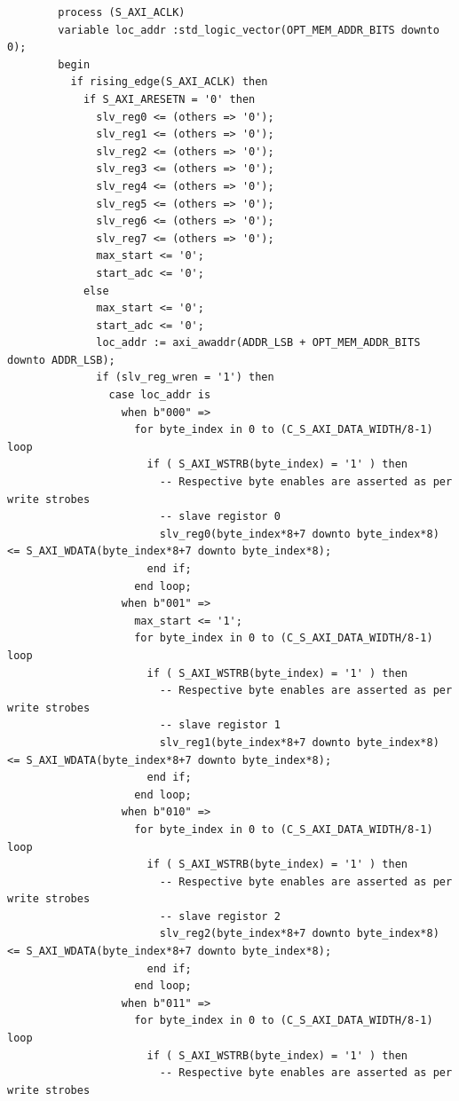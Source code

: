 \begin{verbatim}
        process (S_AXI_ACLK)
        variable loc_addr :std_logic_vector(OPT_MEM_ADDR_BITS downto 0); 
        begin
          if rising_edge(S_AXI_ACLK) then 
            if S_AXI_ARESETN = '0' then
              slv_reg0 <= (others => '0');
              slv_reg1 <= (others => '0');
              slv_reg2 <= (others => '0');
              slv_reg3 <= (others => '0');
              slv_reg4 <= (others => '0');
              slv_reg5 <= (others => '0');
              slv_reg6 <= (others => '0');
              slv_reg7 <= (others => '0');
              max_start <= '0';
              start_adc <= '0';
            else
              max_start <= '0';
              start_adc <= '0';
              loc_addr := axi_awaddr(ADDR_LSB + OPT_MEM_ADDR_BITS downto ADDR_LSB);
              if (slv_reg_wren = '1') then
                case loc_addr is
                  when b"000" =>
                    for byte_index in 0 to (C_S_AXI_DATA_WIDTH/8-1) loop
                      if ( S_AXI_WSTRB(byte_index) = '1' ) then
                        -- Respective byte enables are asserted as per write strobes                   
                        -- slave registor 0
                        slv_reg0(byte_index*8+7 downto byte_index*8) <= S_AXI_WDATA(byte_index*8+7 downto byte_index*8);
                      end if;
                    end loop;
                  when b"001" =>
                    max_start <= '1';
                    for byte_index in 0 to (C_S_AXI_DATA_WIDTH/8-1) loop
                      if ( S_AXI_WSTRB(byte_index) = '1' ) then
                        -- Respective byte enables are asserted as per write strobes                   
                        -- slave registor 1
                        slv_reg1(byte_index*8+7 downto byte_index*8) <= S_AXI_WDATA(byte_index*8+7 downto byte_index*8);
                      end if;
                    end loop;
                  when b"010" =>
                    for byte_index in 0 to (C_S_AXI_DATA_WIDTH/8-1) loop
                      if ( S_AXI_WSTRB(byte_index) = '1' ) then
                        -- Respective byte enables are asserted as per write strobes                   
                        -- slave registor 2
                        slv_reg2(byte_index*8+7 downto byte_index*8) <= S_AXI_WDATA(byte_index*8+7 downto byte_index*8);
                      end if;
                    end loop;
                  when b"011" =>
                    for byte_index in 0 to (C_S_AXI_DATA_WIDTH/8-1) loop
                      if ( S_AXI_WSTRB(byte_index) = '1' ) then
                        -- Respective byte enables are asserted as per write strobes                   

\end{verbatim}
